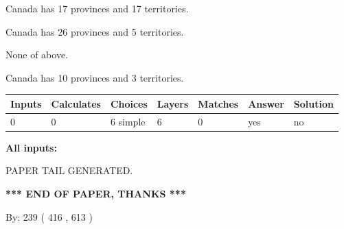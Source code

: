 \documentclass[12pt]{article}
\begin{document}
 
Canada has  17 provinces and  17 territories.
 
 
Canada has  26 provinces and  5 territories.
 
 
 None of above.
 
 
\noindent{}
 
 
Canada has 10  provinces and 3 territories.
 
 
\noindent{}
 
 
   
   
   
   
\noindent\begin{tabular}{|l|l|l|l|l|l|l|}
 \hline
Inputs & Calculates & Choices & Layers & Matches & Answer & Solution \\ \hline
 0  & 
 0  & 
 6
  simple  
  & 
 6  & 
 0  & 
  yes & 
  no 
  \\ \hline
 \end{tabular}
   
   
   
   
\noindent{}
   
   
   
   
\noindent\vspace{0.1in}\hspace{-0.08in} {\textbf{\Large{All inputs: }}}
   
   
   
   
   
   
 \vspace{0.2in}
 
   
   
\vspace{2.0in} PAPER TAIL GENERATED.
   
   
   
   
\vspace{1.0in} 
{\textbf{\large{ *** END OF PAPER, THANKS *** }}} 
   
   
\hspace{1.0in} By: 
 239 ( 416 ,  613 )
   
   
   
   
\newpage 
\setcounter{page}{ 
   583001 } 
   
   
   
\end{document}
